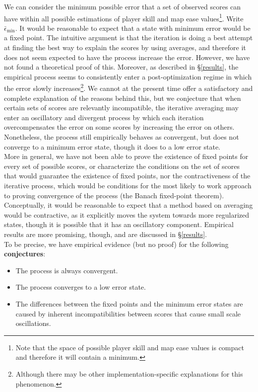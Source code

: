 \documentclass[12pt,a4paper]{article}
\begin{document}
We can consider the minimum possible error that a set of observed scores can have within all possible estimations of player skill and map ease values\footnote{Note that the space of possible player skill and map ease values is compact and therefore it will contain a minimum.}. Write ${\bar{\epsilon}}_{\min}$. It would be reasonable to expect that a state with minimum error would be a fixed point. The intuitive argument is that the iteration is doing a best attempt at finding the best way to explain the scores by using averages, and therefore it does not seem expected to have the process increase the error. However, we have not found a theoretical proof of this. Moreover, as described in \S \ref{results}, the empirical process seems to consistently enter a post-optimization regime in which the error slowly increases\footnote{Although there may be other implementation-specific explanations for this phenomenon.}. We cannot at the present  time offer a satisfactory and complete explanation of the reasons behind this, but we conjecture that when certain sets of scores are relevantly incompatible, the iterative averaging may enter an oscillatory and divergent process by which each iteration overcompensates the error on some scores by increasing the error on others. Nonetheless, the process still empirically behaves as convergent, but does not converge to a minimum error state, though it does to a low error state.\\

More in general, we have not been able to prove the existence of fixed points for every set of possible scores, or characterize the conditions on the set of scores that would guarantee the existence of fixed points, nor the contractiveness of the iterative process, which would be conditions for the most likely to work approach to proving convergence of the process (the Banach fixed-point theorem). Conceptually, it would be reasonable to expect that a method based on averaging would be contractive, as it explicitly moves the system towards more regularized states, though it is possible that it has an oscillatory component. Empirical results are more promising, though, and are discussed in \S \ref{results}.\\

To be precise, we have empirical evidence (but no proof) for the following {\bf{conjectures}}:

\begin{itemize}
\item The process is always convergent.
\item The process converges to a low error state.
\item The differences between the fixed points and the minimum error states are caused by inherent incompatibilities between scores  that cause small scale oscillations.
\end{itemize}
\end{document}
